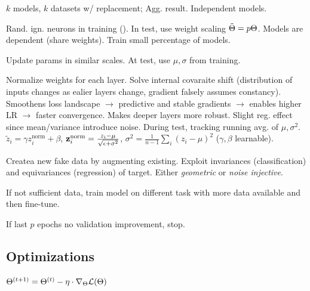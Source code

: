 \begin{definition}
    \(k\) models, \(k\) datasets w/ replacement; Agg. result. Independent models.
\end{definition}

\begin{definition}[Dropout]
    Rand. ign. neurons in training (). In test, use weight scaling \(\tilde{\Theta} = p\Theta\). Models are dependent (share weights). Train small percentage of models.
\end{definition}

\begin{definition}
    Update params in similar scales. At test, use \(\mu, \sigma\) from training.
\end{definition}

\begin{definition}
    Normalize weights for each layer. Solve internal covaraite shift (distribution of inputs changes as ealier layers change, gradient falsely assumes constancy). Smoothens loss landscape \(\to\) predictive and stable gradients \(\to\) enables higher LR \(\to\) faster convergence.
    Makes deeper layers more robust. Slight reg. effect since mean/variance introduce noise. During test, tracking running avg. of \(\mu, \sigma^2\).
    \(\tilde z_i = \gamma z_i^{\text{norm}} + \beta\), \(\vb{z}_i^{\text{norm}} = \frac{z_i - \mu}{\sqrt{\epsilon + \sigma^2}}\), \(\sigma^2 = \frac{1}{n-1}\sum_i(z_i - \mu)^2\) (\(\gamma, \beta\) learnable).
\end{definition}

\begin{definition}
    Createa new fake data by augmenting existing. Exploit invariances (classification) and equivariances (regression) of target. Either \textit{geometric} or \textit{noise injective}.
\end{definition}

\begin{definition}
    If not sufficient data, train model on different task with more data available and then fine-tune.
\end{definition}

\begin{definition}
    If last \(p\) epochs no validation improvement, stop.
\end{definition}

\subsection{Optimizations}
\begin{definition}[GD]
    \(\Theta^{(t+1)} = \Theta^{(t)} - \eta \cdot \nabla_\Theta \mathcal{L}(\Theta)\)
\end{definition}

